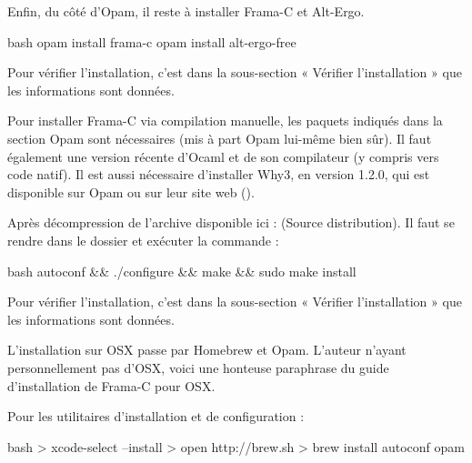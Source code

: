 Enfin, du côté d'Opam, il reste à installer Frama-C et Alt-Ergo.



\begin{CodeBlock}{bash}
opam install frama-c
opam install alt-ergo-free
\end{CodeBlock}



Pour vérifier l'installation, c'est dans la sous-section « Vérifier l'installation »
que les informations sont données.





Pour installer Frama-C via compilation manuelle, les paquets indiqués dans la 
section Opam sont nécessaires (mis à part Opam lui-même bien sûr). Il faut
également une version récente d'Ocaml et de son compilateur (y compris vers 
code natif). Il est aussi nécessaire d'installer Why3, en version 1.2.0,
qui est disponible sur Opam ou sur leur site web
().



Après décompression de l'archive disponible ici : 
 (Source distribution). 
Il faut se rendre dans le dossier et exécuter la commande :



\begin{CodeBlock}{bash}
autoconf && ./configure && make && sudo make install
\end{CodeBlock}



Pour vérifier l'installation, c'est dans la sous-section « Vérifier l'installation »
que les informations sont données.





L'installation sur OSX passe par Homebrew et Opam. L'auteur n'ayant
personnellement pas d'OSX, voici une honteuse paraphrase du guide 
d'installation de Frama-C pour OSX.



Pour les utilitaires d'installation et de configuration :



\begin{CodeBlock}{bash}
> xcode-select --install 
> open http://brew.sh
> brew install autoconf opam 
\end{CodeBlock}



